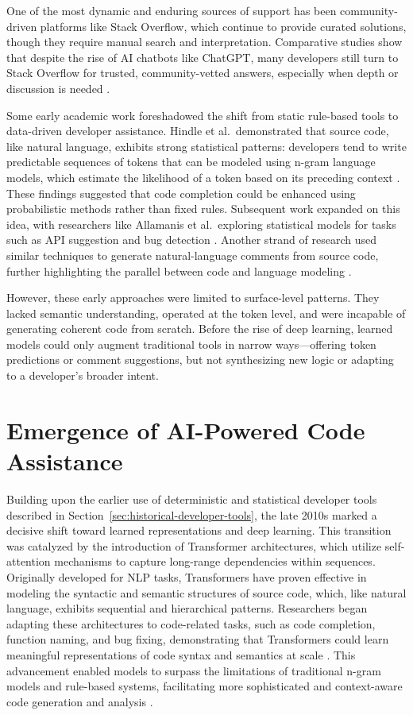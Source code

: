 One of the most dynamic and enduring sources of support has been community-driven platforms like Stack Overflow, which continue to provide curated solutions, though they require manual search and interpretation. Comparative studies show that despite the rise of \gls{AI} chatbots like ChatGPT, many developers still turn to Stack Overflow for trusted, community-vetted answers, especially when depth or discussion is needed \autocite{Liu2023Comparative}.

Some early academic work foreshadowed the shift from static rule-based tools to data-driven developer assistance. Hindle et al.\ demonstrated that source code, like natural language, exhibits strong statistical patterns: developers tend to write predictable sequences of tokens that can be modeled using n-gram language models, which estimate the likelihood of a token based on its preceding context \autocite{Hindle2012}. These findings suggested that code completion could be enhanced using probabilistic methods rather than fixed rules. Subsequent work expanded on this idea, with researchers like Allamanis et al.\ exploring statistical models for tasks such as API suggestion and bug detection \autocite{Allamanis2018}. Another strand of research used similar techniques to generate natural-language comments from source code, further highlighting the parallel between code and language modeling \autocite{MovshovitzAttias2013}.

However, these early approaches were limited to surface-level patterns. They lacked semantic understanding, operated at the token level, and were incapable of generating coherent code from scratch. Before the rise of deep learning, learned models could only augment traditional tools in narrow ways—offering token predictions or comment suggestions, but not synthesizing new logic or adapting to a developer’s broader intent.

\section{Emergence of AI-Powered Code Assistance}
\label{sec:emergence-ai-code-assistance}

Building upon the earlier use of deterministic and statistical developer tools described in Section~\ref{sec:historical-developer-tools}, the late 2010s marked a decisive shift toward learned representations and deep learning. This transition was catalyzed by the introduction of Transformer architectures, which utilize self-attention mechanisms to capture long-range dependencies within sequences. Originally developed for \gls{NLP} tasks, Transformers have proven effective in modeling the syntactic and semantic structures of source code, which, like natural language, exhibits sequential and hierarchical patterns. Researchers began adapting these architectures to code-related tasks, such as code completion, function naming, and bug fixing, demonstrating that Transformers could learn meaningful representations of code syntax and semantics at scale . This advancement enabled models to surpass the limitations of traditional n-gram models and rule-based systems, facilitating more sophisticated and context-aware code generation and analysis \autocite{Chirkova2021}.

